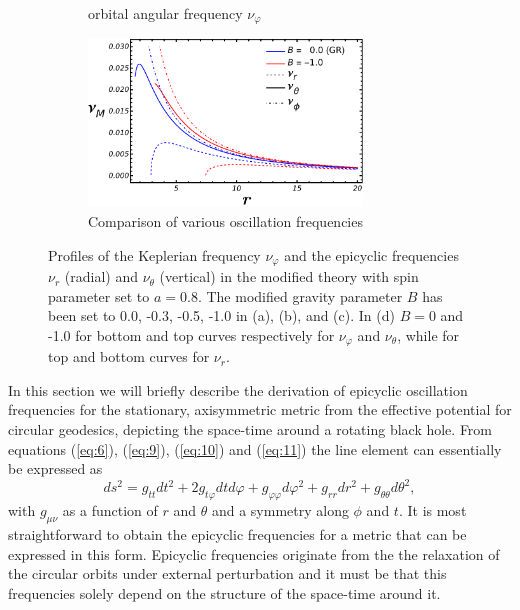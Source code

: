 \documentclass[12pt,a4paper,oneside]{book}
\newcommand{\eq}[2]{\begin{equation} \label{eq:#1} #2 \end{equation}}
\newcommand{\Eref}[1]{(\ref{eq:#1})}
\begin{document}
\begin{figure}[t]
\begin{subfigure}[b]{0.5\textwidth}
	\caption{orbital angular frequency $\nu_\varphi$}
    		\label{nu_phi_for_a_1}
     \end{subfigure}
 \begin{subfigure}[b]{0.5\textwidth}
         \centering
         \includegraphics[width=0.8\textwidth]{Combine_Image.pdf}
	\caption{Comparison of various oscillation frequencies}
    		\label{nu_all_for_a_1}
     \end{subfigure}
        \caption{Profiles of the Keplerian frequency $\nu_\varphi$ and the epicyclic frequencies $\nu_r$ (radial) and $\nu_\theta$ (vertical) in the modified theory with spin parameter set to $a = 0.8$. The modified gravity parameter $B$ has been set to 0.0, -0.3, -0.5, -1.0 in (a), (b), and (c). In (d) $B=0$ and 
-1.0 for bottom and top curves respectively for $\nu_\varphi$ and $\nu_\theta$,
while for top and bottom curves for $\nu_r$.}
        \label{four graphs}
\end{figure}
In this section we will briefly describe the derivation of epicyclic oscillation frequencies for the stationary, axisymmetric metric from the effective potential for circular geodesics, depicting the space-time around a rotating black hole. From equations \Eref{6}, \Eref{9}, \Eref{10} and \Eref{11} the line element can essentially be expressed as
\eq{line_element}{ds^2 = g_{tt}dt^2+2g_{t\varphi}dtd\varphi+g_{\varphi\varphi}d\varphi^2+g_{rr}dr^2+g_{\theta\theta}d\theta^2,} 
with $g_{\mu\nu}$ as a function of $r$ and $\theta$ and a symmetry along $\phi$
and $t$. It is most straightforward to obtain the epicyclic frequencies for a metric that can be expressed in this form. Epicyclic frequencies originate from the the relaxation of the circular orbits under external perturbation and it must be that this frequencies solely depend on the structure of the space-time around it. 
\end{document}
